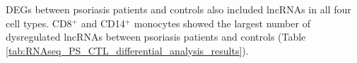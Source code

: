 DEGs between psoriasis patients and controls also included lncRNAs in all four cell types. CD8$^+$ and CD14$^+$ monocytes showed the largest number of dysregulated lncRNAs between psoriasis patients and controls (Table \ref{tab:RNAseq_PS_CTL_differential_analysis_results}). 

%

